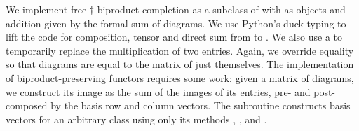 We implement free $\dagger$-biproduct completion as a subclass of  with  as objects and addition given by the formal sum of diagrams.
We use Python's duck typing to lift the code for composition, tensor and direct sum from  to .
We also use a  to temporarily replace the multiplication of two  entries.
Again, we override equality so that diagrams are equal to the matrix of just themselves.
The implementation of biproduct-preserving functors requires some work: given a matrix of diagrams, we construct its image as the sum of the images of its entries, pre- and post-composed by the basis row and column vectors.
The  subroutine constructs basis vectors for an arbitrary class using only its methods , ,  and .


